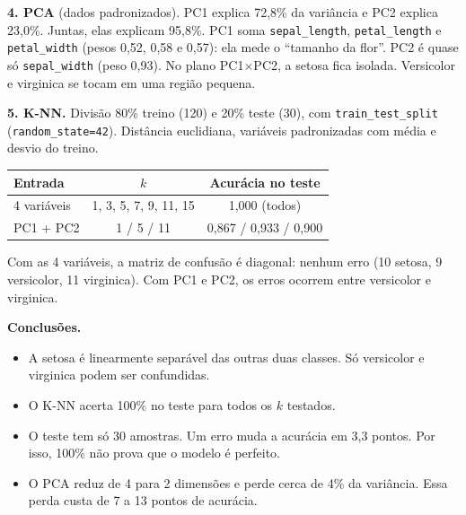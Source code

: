 \documentclass[10pt]{extarticle}
\begin{document}
\textbf{4. PCA} (dados padronizados). PC1 explica 72,8\% da variância e PC2 explica 23,0\%.
Juntas, elas explicam 95,8\%. PC1 soma \texttt{sepal\_length}, \texttt{petal\_length} e \texttt{petal\_width}
(pesos 0,52, 0,58 e 0,57): ela mede o ``tamanho da flor''.
PC2 é quase só \texttt{sepal\_width} (peso 0,93).
No plano PC1$\times$PC2, a setosa fica isolada. Versicolor e virginica se tocam em uma região pequena.

\textbf{5. K-NN.} Divisão 80\% treino (120) e 20\% teste (30), com \texttt{train\_test\_split} (\texttt{random\_state=42}).
Distância euclidiana, variáveis padronizadas com média e desvio do treino.
\begin{center}\footnotesize
\begin{tabular}{lcc}
\toprule
Entrada & $k$ & Acurácia no teste \\
\midrule
4 variáveis & 1, 3, 5, 7, 9, 11, 15 & 1,000 (todos) \\
PC1 + PC2 & 1 / 5 / 11 & 0,867 / 0,933 / 0,900 \\
\bottomrule
\end{tabular}
\end{center}
Com as 4 variáveis, a matriz de confusão é diagonal: nenhum erro (10 setosa, 9 versicolor, 11 virginica).
Com PC1 e PC2, os erros ocorrem entre versicolor e virginica.

\textbf{Conclusões.}
\begin{itemize}
\item A setosa é linearmente separável das outras duas classes. Só versicolor e virginica podem ser confundidas.
\item O K-NN acerta 100\% no teste para todos os $k$ testados.
\item O teste tem só 30 amostras. Um erro muda a acurácia em 3,3 pontos. Por isso, 100\% não prova que o modelo é perfeito.
\item O PCA reduz de 4 para 2 dimensões e perde cerca de 4\% da variância. Essa perda custa de 7 a 13 pontos de acurácia.
\end{itemize}
\end{document}
